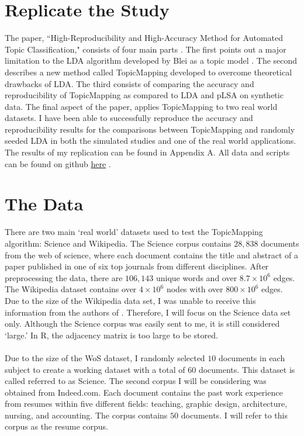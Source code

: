 \documentclass[12pt]{article}
\begin{document}
\section{Replicate the Study}

The paper, ``High-Reproducibility and High-Accuracy Method for Automated Topic Classification," consists of four main parts \cite{main}. The first points out a major limitation to the LDA algorithm developed by Blei as a topic model \cite{lda}. The second describes a new method called TopicMapping developed to overcome theoretical drawbacks of LDA. The third consists of comparing the accuracy and reproducibility of TopicMapping as compared to LDA and pLSA \cite{plsa} on synthetic data. The final aspect of the paper, applies TopicMapping to two real world datasets. I have been able to successfully reproduce the accuracy and reproducibility results for the comparisons between TopicMapping and randomly seeded LDA in both the simulated studies and one of the real world applications. The results of my replication can be found in Appendix A. All data and scripts can be found on github \href{https://github.com/cmcook22/Cook_Networks_Project}{here} .    

\section{The Data}

There are two main `real world' datasets used to test the TopicMapping algorithm:  Science and Wikipedia. The Science corpus contains $28,838$ documents from the web of science, where each document contains the title and abstract of a paper published in one of six top journals from different disciplines. After preprocessing the data, there are $106,143$ unique words and over $8.7 \times 10^{6}$ edges. The Wikipedia dataset contains over $4 \times 10^{6}$ nodes with over $800 \times 10^{6}$ edges. Due to the size of the Wikipedia data set, I was unable to receive this information from the authors of \cite{main}. Therefore, I will focus on the Science data set only. Although the Science corpus was easily sent to me, it is still considered `large.' In R, the adjacency matrix is too large to be stored. 
\\
\\
Due to the size of the WoS dataset, I randomly selected $10$ documents in each subject to create a working dataset with a total of $60$ documents. This dataset is called referred to as Science. The second corpus I will be considering was obtained from Indeed.com. Each document contains the past work experience from resumes within five different fields: teaching, graphic design, architecture, nursing, and accounting. The corpus contains $50$ documents. I will refer to this corpus as the resume corpus. 
\end{document}
